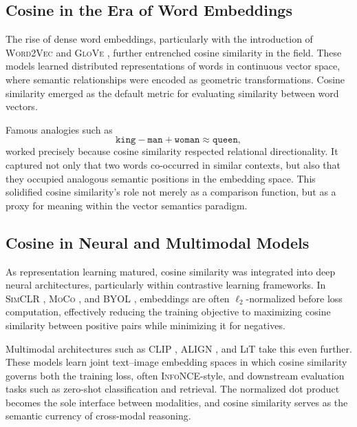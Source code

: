 \documentclass[11pt]{article}
\begin{document}
\subsection{Cosine in the Era of Word Embeddings}

The rise of dense word embeddings, particularly with the introduction of \textsc{Word2Vec} \citep{mikolov_2013_EfficientEstimationWord} and \textsc{GloVe} \citep{pennington_2014_GloveGlobalVectors}, further entrenched cosine similarity in the field. These models learned distributed representations of words in continuous vector space, where semantic relationships were encoded as geometric transformations. Cosine similarity emerged as the default metric for evaluating similarity between word vectors.

Famous analogies such as
\begin{equation*}
	\texttt{king} - \texttt{man} + \texttt{woman} \approx \texttt{queen},
\end{equation*}
worked precisely because cosine similarity respected relational directionality. It captured not only that two words co-occurred in similar contexts, but also that they occupied analogous semantic positions in the embedding space. This solidified cosine similarity's role not merely as a comparison function, but as a proxy for meaning within the vector semantics paradigm.

\subsection{Cosine in Neural and Multimodal Models}

As representation learning matured, cosine similarity was integrated into deep neural architectures, particularly within contrastive learning frameworks. In \textsc{SimCLR} \citep{chen_2020_SimpleFrameworkContrastive}, \textsc{MoCo} \citep{he_2020_MomentumContrastUnsupervised}, and \textsc{BYOL} \citep{grill_2020_BootstrapYourOwna}, embeddings are often $\ell_2$-normalized before loss computation, effectively reducing the training objective to maximizing cosine similarity between positive pairs while minimizing it for negatives.

Multimodal architectures such as \textsc{CLIP} \citep{radford_2021_LearningTransferableVisual}, \textsc{ALIGN} \citep{jia_2021_ScalingVisualVisionlanguage}, and \textsc{LiT} \citep{zhai_2022_LiTZeroShotTransfer} take this even further. These models learn joint text--image embedding spaces in which cosine similarity governs both the training loss, often \textsc{InfoNCE}-style, and downstream evaluation tasks such as zero-shot classification and retrieval. The normalized dot product becomes the sole interface between modalities, and cosine similarity serves as the semantic currency of cross-modal reasoning.
\end{document}
